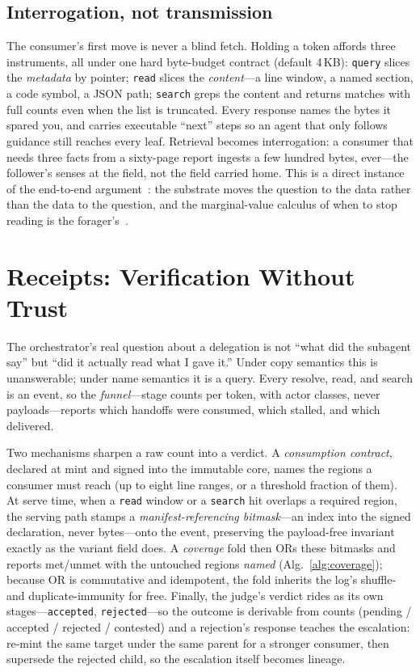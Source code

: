 \documentclass[10pt,twocolumn]{article}
\newcommand{\tok}[1]{\texttt{#1}}
\begin{document}
\subsection{Interrogation, not transmission}
The consumer's first move is never a blind fetch. Holding a token affords
three instruments, all under one hard byte-budget contract (default
4\,KB): \tok{query} slices the \emph{metadata} by pointer; \tok{read}
slices the \emph{content}---a line window, a named section, a code symbol,
a JSON path; \tok{search} greps the content and returns matches with full
counts even when the list is truncated. Every response names the bytes it
spared you, and carries executable ``next'' steps so an agent that only
follows guidance still reaches every leaf. Retrieval becomes
interrogation: a consumer that needs three facts from a sixty-page report
ingests a few hundred bytes, ever---the follower's senses at the field,
not the field carried home. This is a direct instance of the end-to-end
argument~\citep{saltzer1984}: the substrate moves the question to the data
rather than the data to the question, and the marginal-value calculus of
when to stop reading is the forager's~\citep{charnov1976,pirolli1999}.

\section{Receipts: Verification Without Trust}
\label{sec:receipts}

The orchestrator's real question about a delegation is not ``what did the
subagent say'' but ``did it actually read what I gave it.'' Under copy
semantics this is unanswerable; under name semantics it is a query. Every
resolve, read, and search is an event, so the \emph{funnel}---stage counts
per token, with actor classes, never payloads---reports which handoffs were
consumed, which stalled, and which delivered.

Two mechanisms sharpen a raw count into a verdict. A \emph{consumption
contract}, declared at mint and signed into the immutable core, names the
regions a consumer must reach (up to eight line ranges, or a threshold
fraction of them). At serve time, when a \tok{read} window or a
\tok{search} hit overlaps a required region, the serving path stamps a
\emph{manifest-referencing bitmask}---an index into the signed
declaration, never bytes---onto the event, preserving the payload-free
invariant exactly as the variant field does. A \emph{coverage} fold then
$\mathrm{OR}$s these bitmasks and reports met/unmet with the untouched
regions \emph{named} (Alg.~\ref{alg:coverage}); because $\mathrm{OR}$ is
commutative and idempotent, the fold inherits the log's shuffle- and
duplicate-immunity for free. Finally, the judge's verdict rides as its own
stages---\tok{accepted}, \tok{rejected}---so the outcome is derivable from
counts (pending / accepted / rejected / contested) and a rejection's
response teaches the escalation: re-mint the same target under the same
parent for a stronger consumer, then supersede the rejected child, so the
escalation itself becomes lineage.
\end{document}
